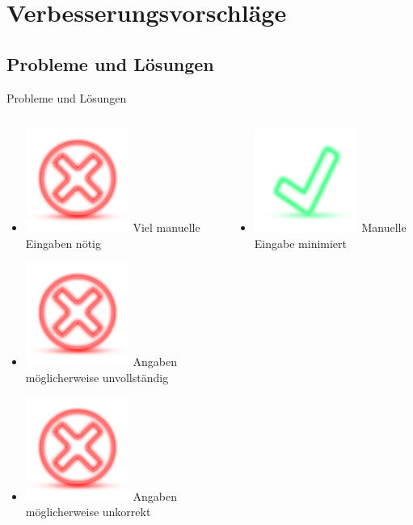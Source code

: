 \documentclass{beamer} %
\begin{document}
	\section{Verbesserungsvorschläge}
	\subsection{Probleme und Lösungen}
	\begin{frame}{Probleme und Lösungen}
		\begin{columns}[c]
			\begin{column}{0.5\textwidth}
				\begin{itemize}
					\item \includegraphics[height=\baselineskip]{material/dialog-cancel.png} Viel manuelle Eingaben nötig
					\item \includegraphics[height=\baselineskip]{material/dialog-cancel.png} Angaben möglicherweise unvollständig
					\item \includegraphics[height=\baselineskip]{material/dialog-cancel.png} Angaben möglicherweise unkorrekt
				\end{itemize}
			\end{column}
			\pause
			\begin{column}{0.5\textwidth}
				\begin{itemize}
					\item \includegraphics[height=\baselineskip]{material/dialog-ok.png} Manuelle Eingabe minimiert

\end{itemize}
\end{column}
\end{columns}
\end{frame}
\end{document}
